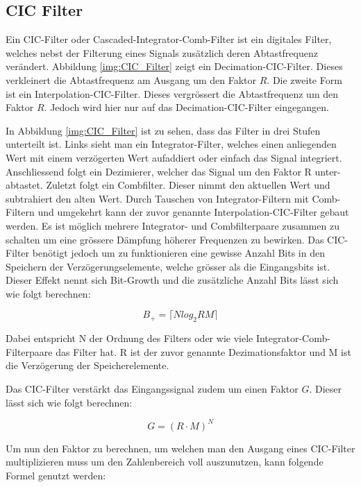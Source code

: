 \subsection{CIC Filter}\label{subsec:CIC_Filter}

Ein CIC-Filter oder Cascaded-Integrator-Comb-Filter ist ein digitales Filter, welches nebst der Filterung eines Signals zusätzlich deren Abtastfrequenz verändert. Abbildung \ref{img:CIC_Filter} zeigt ein Decimation-CIC-Filter. Dieses verkleinert die Abtastfrequenz am Ausgang um den Faktor \(R\). Die zweite Form ist ein Interpolation-CIC-Filter. Dieses vergrössert die Abtastfrequenz um den Faktor \(R\). Jedoch wird hier nur auf das Decimation-CIC-Filter eingegangen.

In Abbildung \ref{img:CIC_Filter} ist zu sehen, dass das Filter in drei Stufen unterteilt ist. Links sieht man ein Integrator-Filter, welches einen anliegenden Wert mit einem verzögerten Wert aufaddiert oder einfach das Signal integriert. Anschliessend folgt ein Dezimierer, welcher das Signal um den Faktor R unter-abtastet. Zuletzt folgt ein Combfilter. Dieser nimmt den aktuellen Wert und subtrahiert den alten Wert. Durch Tauschen von Integrator-Filtern mit Comb-Filtern und umgekehrt kann der zuvor genannte Interpolation-CIC-Filter gebaut werden. Es ist möglich mehrere Integrator- und Combfilterpaare zusammen zu schalten um eine grössere Dämpfung höherer Frequenzen zu bewirken. Das CIC-Filter benötigt jedoch um zu funktionieren eine gewisse Anzahl Bits in den Speichern der Verzögerungselemente, welche grösser als die Eingangsbits ist. Dieser Effekt nennt sich Bit-Growth und die zusätzliche Anzahl Bits lässt sich wie folgt berechnen\cite{cic_a}\cite{cic_b}:

\begin{equation}
B_+ = \big \lceil Nlog_2RM \big \rceil
\label{equ:cic_bitgrowth}
\end{equation}

Dabei entspricht N der Ordnung des Filters oder wie viele Integrator-Comb-Filterpaare das Filter hat. R ist der zuvor genannte Dezimationsfaktor und M ist die Verzögerung der Speicherelemente.

Das CIC-Filter verstärkt das Eingangssignal zudem um einen Faktor \(G\). Dieser lässt sich wie folgt berechnen:

 \begin{equation}
 G = (R\cdot M)^N
 \label{equ:cic_gain}
 \end{equation}
 
Um nun den Faktor zu berechnen, um welchen man den Ausgang eines CIC-Filter multiplizieren muss um den Zahlenbereich voll auszunutzen, kann folgende Formel genutzt werden:


